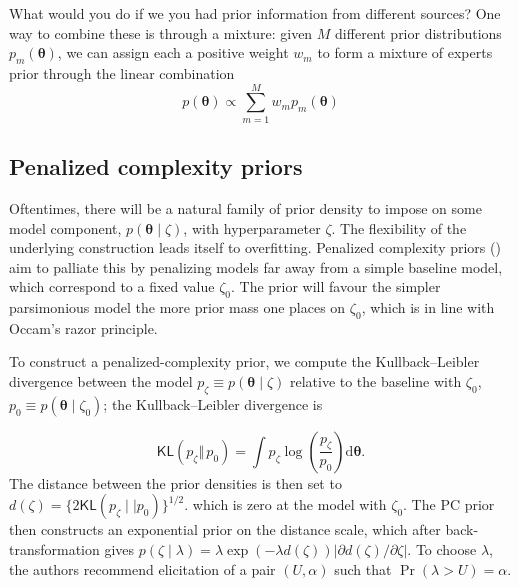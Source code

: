 \documentclass[
  11pt,
  letterpaper,
]{scrbook}
\theoremstyle{definition}
\theoremstyle{definition}
\theoremstyle{definition}
\theoremstyle{plain}
\theoremstyle{plain}
\theoremstyle{remark}
\begin{document}
What would you do if we you had prior information from different
sources? One way to combine these is through a mixture: given \(M\)
different prior distributions \(p_m(\boldsymbol{\theta})\), we can
assign each a positive weight \(w_m\) to form a mixture of experts prior
through the linear combination
\[ p(\boldsymbol{\theta}) \propto \sum_{m=1}^M w_m p_m(\boldsymbol{\theta})\]

\subsection{Penalized complexity
priors}\label{penalized-complexity-priors}

Oftentimes, there will be a natural family of prior density to impose on
some model component, \(p(\boldsymbol{\theta} \mid \zeta)\), with
hyperparameter \(\zeta\). The flexibility of the underlying construction
leads itself to overfitting. Penalized complexity priors
() aim to palliate this
by penalizing models far away from a simple baseline model, which
correspond to a fixed value \(\zeta_0\). The prior will favour the
simpler parsimonious model the more prior mass one places on
\(\zeta_0\), which is in line with Occam's razor principle.

To construct a penalized-complexity prior, we compute the
Kullback--Leibler divergence between the model
\(p_\zeta \equiv p(\boldsymbol{\theta} \mid \zeta)\) relative to the
baseline with \(\zeta_0\), \(p_0 \equiv p(\boldsymbol{\theta} \mid
\zeta_0)\); the Kullback--Leibler divergence is

\[
\mathsf{KL}(p_\zeta \Vert\, p_0)=\int p_\zeta \log\left(\frac{p_\zeta}{p_0}\right) \mathrm{d} \boldsymbol{\theta}.
\] The distance between the prior densities is then set to
\(d(\zeta) = \{2\mathsf{KL}(p_\zeta \mid\mid p_0)\}^{1/2}\). which is
zero at the model with \(\zeta_0\). The PC prior then constructs an
exponential prior on the distance scale, which after back-transformation
gives
\(p(\zeta \mid \lambda) = \lambda\exp(-\lambda d(\zeta)) \left| {\partial d(\zeta)}/{\partial \zeta}\right|\).
To choose \(\lambda\), the authors recommend elicitation of a pair
\((U, \alpha)\) such that \(\Pr(\lambda > U)=\alpha\).
\end{document}
